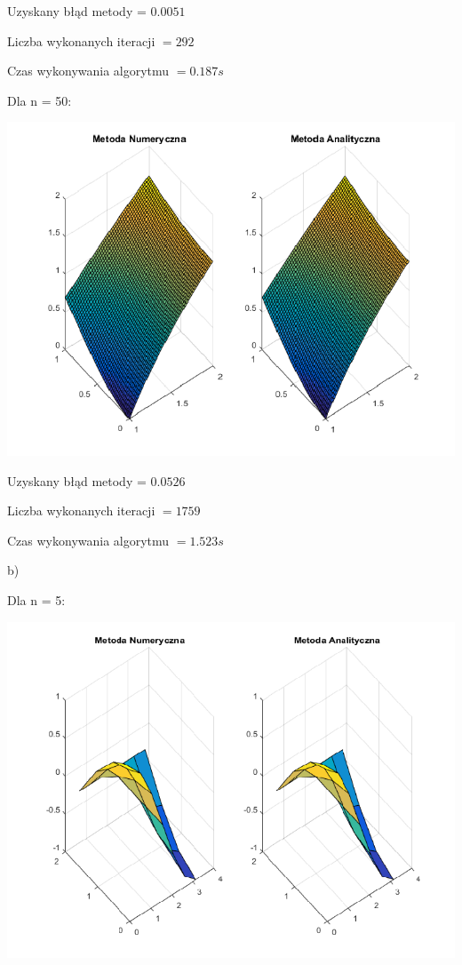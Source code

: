 Uzyskany błąd metody = $0.0051$

Liczba wykonanych iteracji $ = 292 $

Czas wykonywania algorytmu $ = 0.187 s$

\newpage

Dla n = 50:

{\centering
	
	\includegraphics{Lab6/charts/jacobi/1_50.png}
	
}

Uzyskany błąd metody = $0.0526$

Liczba wykonanych iteracji $ = 1759 $

Czas wykonywania algorytmu $ = 1.523 s$

\newpage

b)

Dla n = 5:

{\centering
	
	\includegraphics{Lab6/charts/jacobi/2_5.png}
	
}

